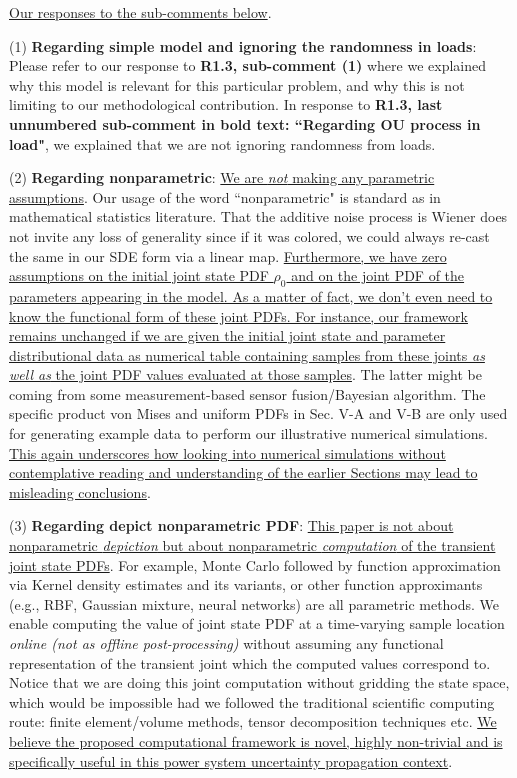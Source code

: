\documentclass[12pt,onecolumn]{IEEEtran}
\newcommand{\blue}{\color{blue}}
\newcommand{\nib}{\noindent  {\bf Response:} }
\begin{document}
{\nib{ \blue \ul{Our responses to the sub-comments below}.

(1) \textbf{Regarding simple model and ignoring the randomness in loads}: Please refer to our response to \textbf{R1.3, sub-comment (1)} where we explained why this model is relevant for this particular problem, and why this is not limiting to our methodological contribution. In response to \textbf{R1.3, last unnumbered sub-comment in bold text: ``Regarding OU process in load"}, we explained that we are not ignoring randomness from loads.

(2) \textbf{Regarding nonparametric}: \ul{We are \emph{not} making any parametric assumptions}. Our usage of the word ``nonparametric" is standard as in mathematical statistics literature. That the additive noise process is Wiener does not invite any loss of generality since if it was colored, we could always re-cast the same in our SDE form via a linear map. \ul{Furthermore, we have zero assumptions on the initial joint state PDF $\rho_{0}$ and on the joint PDF of the parameters appearing in the model. As a matter of fact, we don't even need to know the functional form of these joint PDFs. For instance, our framework remains unchanged if we are given the initial joint state and parameter distributional data as numerical table containing samples from these joints \emph{as well as} the joint PDF values evaluated at those samples}. The latter might be coming from some measurement-based sensor fusion/Bayesian algorithm. The specific product von Mises and uniform PDFs in Sec. V-A and V-B are only used for generating example data to perform our illustrative numerical simulations. \ul{This again underscores how looking into numerical simulations without contemplative reading and understanding of the earlier Sections may lead to misleading conclusions}.

(3) \textbf{Regarding depict nonparametric PDF}: \ul{This paper is not about nonparametric \emph{depiction} but about nonparametric \emph{computation} of the transient joint state PDFs}. For example, Monte Carlo followed by function approximation via Kernel density estimates and its variants, or other function approximants (e.g., RBF, Gaussian mixture, neural networks) are all parametric methods. We enable computing the value of joint state PDF at a time-varying sample location \emph{online (not as offline post-processing)} without assuming any functional representation of the transient joint which the computed values correspond to. Notice that we are doing this joint computation without gridding the state space, which would be impossible had we followed the traditional scientific computing route: finite element/volume methods, tensor decomposition techniques etc. \ul{We believe the proposed computational framework is novel, highly non-trivial and is specifically useful in this power system uncertainty propagation context}.
}}
\end{document}

